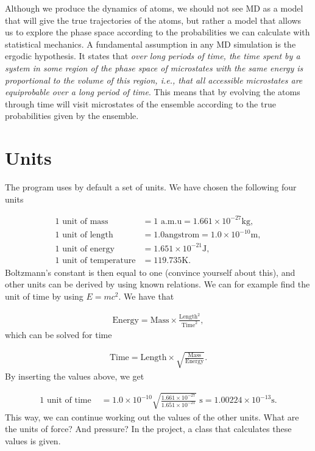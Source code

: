 \documentclass[%
oneside,                 %
final,                   %
10pt]{article}
\begin{document}
Although we produce the dynamics of atoms, we should not see MD as a model that will give the true trajectories of the atoms, but rather a model that allows us to explore the phase space according to the probabilities we can calculate with statistical mechanics. A fundamental assumption in any MD simulation is the ergodic hypothesis. It states that \emph{over long periods of time, the time spent by a system in some region of the phase space of microstates with the same energy is proportional to the volume of this region, i.e., that all accessible microstates are equiprobable over a long period of time}. This means that by evolving the atoms through time will visit microstates of the ensemble according to the true probabilities given by the ensemble.

\section*{Units}

The program uses by default a set of units. We have chosen the following four units

\begin{align}
	\text{1 unit of mass } &= 1 \text{ a.m.u} = 1.661\times 10^{-27}\mathrm{kg},\\
	\text{1 unit of length } &= 1.0 \mathrm{angstrom} = 1.0\times 10^{-10}\mathrm{m},\\
	\text{1 unit of energy } &= 1.651\times 10^{-21}\mathrm{J},\\
	\text{1 unit of temperature} &= 119.735\mathrm{K}.
\end{align}
Boltzmann's constant is then equal to one (convince yourself about this), and other units can be derived by using known relations. We can for example find the unit of time by using $E=mc^2$. We have that

\begin{align}
	\text{Energy} = \text{Mass} \times \frac{\text{Length}^2}{\text{Time}^2},
\end{align}
which can be solved for time

\begin{align}
	\text{Time} = \text{Length} \times \sqrt{\frac{\text{Mass}}{\text{Energy}}}.
\end{align}
By inserting the values above, we get

\begin{align}
	\text{1 unit of time } &= 1.0 \times 10^{-10}\sqrt{\frac{1.661\times 10^{-27}}{1.651\times 10^{-21}}} \text{ s} = 1.00224\times 10^{-13}\mathrm{s}.
\end{align}
This way, we can continue working out the values of the other units. What are the units of force? And pressure? In the project, a class that calculates these values is given.
\end{document}
